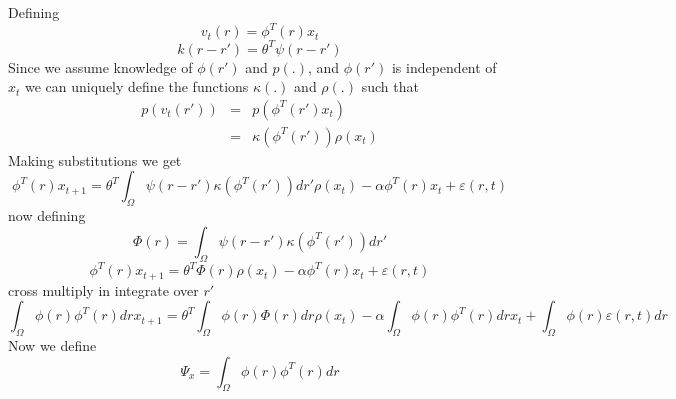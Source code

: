 \documentclass[onecolumn,draftcls]{IEEEtran}
\begin{document}
Defining
\begin{equation}\label{Def1}
   {v_t}\left( r \right) = {\phi ^T}\left( r \right){x_t}
\end{equation}
\begin{equation}\label{Def2}
k\left( {r - r'} \right) = {\theta ^T}\psi \left( {r - r'} \right)
\end{equation}
Since we assume knowledge of $\phi(r')$ and $p(.)$, and $\phi(r')$ is independent of $x_t$ we can uniquely define the functions $\kappa(.)$ and $\rho(.)$ such that
\begin{eqnarray}
  p\left( {{v_t}\left( {r'} \right)} \right)  &=& p\left( {{\phi ^T}\left( {r'} \right){x_t}} \right) \\
   &=& \kappa \left( {{\phi ^T}\left( {r'} \right)} \right)\rho \left( {{x_t}} \right) 
\end{eqnarray}
Making substitutions we get
\begin{equation}\label{Subs}
{\phi ^T}\left( r \right){x_{t + 1}} = {\theta ^T}\int_\Omega  {\psi \left( {r - r'} \right)\kappa \left( {{\phi ^T}\left( {r'} \right)} \right)dr'} \rho \left( {{x_t}} \right) - \alpha {\phi ^T}\left( r \right){x_t} + \varepsilon \left( {r,t} \right)
\end{equation}
now defining
\begin{equation}\label{Def4}
\Phi \left( r \right) = \int_\Omega  {\psi \left( {r - r'} \right)\kappa \left( {{\phi ^T}\left( {r'} \right)} \right)dr'}
\end{equation}
\begin{equation}\label{Sub2}
{\phi ^T}\left( r \right){x_{t + 1}} = {\theta ^T}\Phi \left( r \right)\rho \left( {{x_t}} \right) - \alpha {\phi ^T}\left( r \right){x_t} + \varepsilon \left( {r,t} \right)
\end{equation}
cross multiply in integrate over $r'$
\begin{equation}\label{CorssMultAndInt}
\int_\Omega  {\phi \left( r \right){\phi ^T}\left( r \right)dr} {x_{t + 1}} = {\theta ^T}\int_\Omega  {\phi \left( r \right)\Phi \left( r \right)dr} \rho \left( {{x_t}} \right) - \alpha \int_\Omega  {\phi \left( r \right){\phi ^T}\left( r \right)dr} {x_t} + \int_\Omega  {\phi \left( r \right)\varepsilon \left( {r,t} \right)dr}
\end{equation}
Now we define
\begin{equation}\label{Def5}
{\Psi _x} = \int_\Omega  {\phi \left( r \right){\phi ^T}\left( r \right)dr} 
\end{equation}
\end{document}
